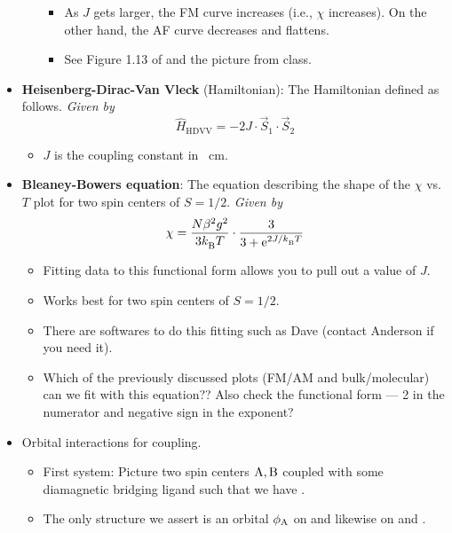 \documentclass[../notes.tex]{subfiles}
\begin{document}
\begin{itemize}
\begin{itemize}
\begin{itemize}
            \item As $J$ gets larger, the FM curve increases (i.e., $\chi$ increases). On the other hand, the AF curve decreases and flattens.
            \item See Figure 1.13 of \textcite{bib:CHEM20200Notes} and the picture from class.
        \end{itemize}
    \end{itemize}
    \item \textbf{Heisenberg-Dirac-Van Vleck} (Hamiltonian): The Hamiltonian defined as follows. \emph{Given by}
    \begin{equation*}
        \hat{H}_\text{HDVV} = -2J\cdot\vec{S}_1\cdot\vec{S}_2
    \end{equation*}
    \begin{itemize}
        \item $J$ is the coupling constant in \si{\per\centi\meter}.
    \end{itemize}
    \item \textbf{Bleaney-Bowers equation}: The equation describing the shape of the $\chi$ vs. $T$ plot for two spin centers of $S=1/2$. \emph{Given by}
    \begin{equation*}
        \chi = \frac{N\beta^2g^2}{3\kB T}\cdot\frac{3}{3+\e[2J/\kB T]}
    \end{equation*}
    \begin{itemize}
        \item Fitting data to this functional form allows you to pull out a value of $J$.
        \item Works best for two spin centers of $S=1/2$.
        \item There are softwares to do this fitting such as Dave (contact Anderson if you need it).
        \item Which of the previously discussed plots (FM/AM and bulk/molecular) can we fit with this equation?? Also check the functional form --- 2 in the numerator and negative sign in the exponent?
    \end{itemize}
    \item Orbital interactions for coupling.
    \begin{itemize}
        \item First system: Picture two spin centers $\ce{A},\ce{B}$ coupled with some diamagnetic bridging ligand  such that we have .
        \item The only structure we assert is an orbital $\phi_{\ce{A}}$ on  and likewise on  and .

\end{itemize}
\end{itemize}
\end{document}
